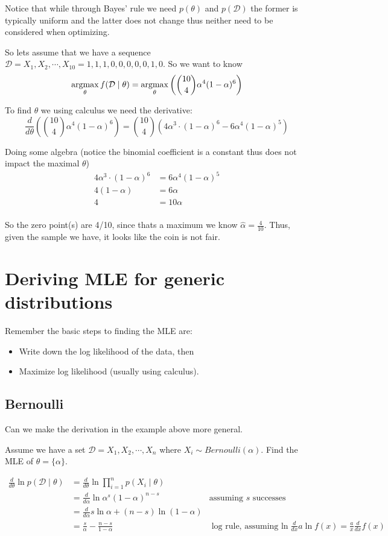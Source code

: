 Notice that while through Bayes' rule we need $p(\theta)$ and $p(\mathcal{D})$ 
the former is typically uniform and the latter does not change thus neither need to be considered when optimizing. 

So lets assume that we have a sequence $\mathcal{D} = X_1, X_2, \cdots, X_{10} = 1,1,1,0,0,0,0,0,1,0$.
So we want to know 
\[\operatorname*{argmax}_\theta f(\mathcal{D}\mid\theta) = \operatorname*{argmax}_\theta \left({10 \choose 4} \alpha^4(1-\alpha)^6\right)\]

To find $\theta$ we using calculus we need the derivative: 
\[\frac{d}{d\theta}\left({10 \choose 4} \alpha^4(1-\alpha)^6\right) = {10 \choose 4}\left(4\alpha^3\cdot(1-\alpha)^6-6\alpha^4(1-\alpha)^5\right)\]

Doing some algebra (notice the binomial coefficient is a constant thus does not impact the maximal $\theta$)
\begin{align*}
4\alpha^3\cdot(1-\alpha)^6&=6\alpha^4(1-\alpha)^5\\
4(1-\alpha) &= 6\alpha\\
4 &= 10\alpha\\
\end{align*}

So the zero point(s) are 4/10, since thats a maximum we know $\hat{\alpha} = \frac{4}{10}$.
Thus, given the sample we have, it looks like the coin is not fair. 

\section{Deriving MLE for generic distributions}
Remember the basic steps to finding the MLE are: 
\begin{itemize}
\item Write down the log likelihood of the data, then
\item Maximize log likelihood (usually using calculus). 
\end{itemize}

\subsection{Bernoulli}

Can we make the derivation in the example above more general. 

Assume we have a set $\mathcal{D} = X_1, X_2, \cdots, X_n$ 
where $X_i \sim Bernoulli(\alpha)$.
Find the MLE of $\theta=\{\alpha\}$.

\begin{align*}
\frac{d}{d\theta} \ln p(\mathcal{D}\mid\theta) 	&= \frac{d}{d\theta} \ln \prod_{i=1}^n p(X_i\mid\theta)\\
					    		     	&= \frac{d}{d\alpha} \ln \alpha^s(1-\alpha)^{n-s} & \text{assuming $s$ successes}\\
					    			& = \frac{d}{d\alpha} s \ln \alpha + (n-s) \ln (1-\alpha)\\
								& = \frac{s}{\alpha} - \frac{n-s}{1-\alpha} 		& \text{log rule, assuming $\ln$} \frac{d}{dx} a \ln f(x) = \frac{a}{x} \frac{d}{dx}  f(x)			     
\end{align*}

